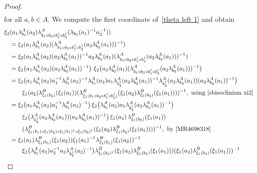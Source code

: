 \documentclass{jonasart}
\theoremstyle{plain}
\begin{document}
\begin{proof}
\begin{eqnarray}
		\end{eqnarray}
		for all $a, b \in A$. We compute the first coordinate of~\eqref{theta left 1} and obtain
		\begin{align*}
			\xi_2 & (a_1\lambda^A_{b_1}(a_2 )\lambda^A_{b_1\circ b_2\circ b_1^\dagger\circ b_2^\dagger}(\lambda_{b_2}(a_1 )^{-1} a_2^{-1}))\\
			&=\xi_2 (a_1\lambda^A_{b_1}(a_2 )(\lambda^A_{b_1\circ b_2\circ b_1^\dagger\circ b_2^\dagger}(a_2\lambda^A_{b_2}(a_1 ) ))^{-1})\\
			&=\xi_2 (a_1\lambda^A_{b_1}(a_2 )(a_2\lambda^A_{b_2}(a_1 ))^{-1} a_2\lambda^A_{b_2}(a_1 ) (\lambda^A_{b_1\circ b_2\circ b_1^\dagger\circ b_2^\dagger}(a_2\lambda^A_{b_2}(a_1 ) ))^{-1})\\
			&=\xi_2\big(a_1\lambda^A_{b_1}(a_2 )(a_2\lambda^A_{b_2}(a_1 ))^{-1} \big)~\xi_2\big(a_2\lambda^A_{b_2}(a_1 )(\lambda^A_{b_1\circ b_2\circ b_1^\dagger\circ b_2^\dagger}(a_2\lambda^A_{b_2}(a_1 ) ))^{-1}\big)\\
			&=\xi_2\big(a_1\lambda^A_{b_1}(a_2 ) a_1^{-1} \lambda^A_{b_1}(a_2 )^{-1} \lambda^A_{b_1}(a_2 ) a_1\lambda^A_{b_2^\dagger}(a_2\lambda^A_{b_2}(a_1 ))^{-1} \lambda^A_{b_2^\dagger}(a_2\lambda^A_{b_2}(a_1 )) (a_2\lambda^A_{b_2}(a_1 ))^{-1} \big)\\
			&\qquad\xi_1 (a_2 )\lambda^B_{\xi_1 (b_2 )}(\xi_1 (a_1 ))(\lambda^B_{\xi_1 (b_1\circ b_2\circ b_1^\dagger\circ b_2^\dagger)}(\xi_1 (a_2 )\lambda^B_{\xi_1 (b_2 )}(\xi_1 (a_1 )) ))^{-1},\text{ using \eqref{sbisoclinism xi2}}\\
			&=\xi_2\big(a_1\lambda^A_{b_1}(a_2 ) a_1^{-1} \lambda^A_{b_1}(a_2 )^{-1}\big) \, \xi_2\big(\lambda^A_{b_1}(a_2 ) a_1\lambda^A_{b_2^\dagger}(a_2\lambda^A_{b_2}(a_1 ))^{-1}\big) \\
			&\qquad \xi_2\big(\lambda^A_{b_2^\dagger}(a_2\lambda^A_{b_2}(a_1 )) (a_2\lambda^A_{b_2}(a_1 ))^{-1} \big) \, \xi_1 (a_2 ) \, \lambda^B_{\xi_1 (b_2 )}(\xi_1 (a_1 )) \\
			&\qquad (\lambda^B_{\xi_1 (b_1 )\circ\xi_1 ( b_2 )\circ \xi_1 (b_1 )^\dagger\circ \xi_1 (b_2 )^\dagger}(\xi_1 (a_2 )\lambda^B_{\xi_1 (b_2 )}(\xi_1 (a_1 )) ))^{-1}, \text{ by \cite[Proposition 3.9]{MR4698318}}\\
			&=\xi_1 (a_1 )\lambda^B_{\xi_1 (b_1 )}(\xi_1 (a_2 )) \xi_1 (a_1 )^{-1} \lambda^B_{\xi_1 (b_1 )}(\xi_1 (a_2 ))^{-1} \\
			&\qquad\xi_2\big(\lambda^A_{b_1}(a_2 ) a_2^{-1} a_2 \lambda^A_{b_2^\dagger}(a_2 )^{-1}\big) \lambda^B_{\xi_1 (b_2 )^\dagger}(\xi_1 (a_2 )\lambda^B_{\xi_1 (b_2 )}(\xi_1 (a_1 ))) (\xi_1 (a_2 )\lambda^B_{\xi_1 (b_2 )}(\xi_1 (a_1 )))^{-1} \\

\end{align*}
\end{proof}
\end{document}
